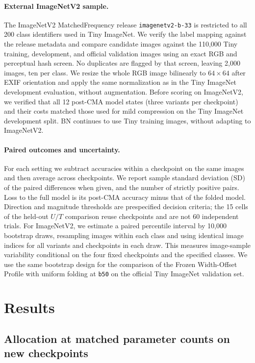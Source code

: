 \documentclass[11pt,a4paper]{article}
\newcommand{\FrozenProfile}{Frozen Width-Offset Profile}
\newcommand{\bfifty}{\texttt{b50}}
\begin{document}
\paragraph{External ImageNetV2 sample.} The ImageNetV2 MatchedFrequency
release \texttt{imagenetv2-b-33} \citep{recht2019imagenetv2} is restricted
to all 200 class identifiers used in Tiny ImageNet. We verify the label
mapping against the release metadata and compare candidate images
against the 110,000 Tiny training, development, and official validation
images using an exact RGB and perceptual hash screen. No duplicates are
flagged by that screen, leaving 2,000 images, ten per class. We resize the
whole RGB image bilinearly to $64\times64$ after EXIF orientation and
apply the same normalization as in the Tiny ImageNet development
evaluation, without augmentation. Before scoring on ImageNetV2, we
verified that all 12 post-CMA model states (three variants per checkpoint)
and their costs matched those used for mild compression on the Tiny
ImageNet development split. BN continues to use Tiny training images,
without adapting to ImageNetV2.

\paragraph{Paired outcomes and uncertainty.} For each setting we subtract
accuracies within a checkpoint on the same images and then average across
checkpoints. We report sample standard deviation (SD) of the paired
differences when given, and the number of strictly positive pairs. Loss to
the full model is its post-CMA accuracy minus that of the folded model.
Direction and magnitude thresholds are prespecified decision criteria;
the 15 cells of the held-out $U/T$ comparison reuse checkpoints and are
not 60 independent trials. For ImageNetV2, we estimate a paired percentile
interval by 10,000 bootstrap draws, resampling images within each class
and using identical image indices for all variants and checkpoints in
each draw. This measures image-sample variability conditional on the four
fixed checkpoints and the specified classes. We use the same bootstrap
design for the comparison of the \FrozenProfile{} with uniform folding at
\bfifty{} on the official Tiny ImageNet validation set.

\section{Results}
\label{sec:results}

\subsection{Allocation at matched parameter counts on new checkpoints}
\label{sec:matched-new}
\end{document}
